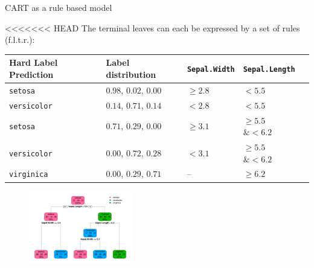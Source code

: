 \documentclass[11pt,compress,t,notes=noshow, xcolor=table]{beamer}
\begin{document}
\begin{vbframe}{CART as a rule based model}

<<<<<<< HEAD
The terminal leaves can each be expressed by a set of rules (f.l.t.r.):

\begin{table}[]
\begin{tabular}{lllll}
Hard Label Prediction &  Label distribution & \texttt{Sepal.Width} & \texttt{Sepal.Length} \\
\hline
\texttt{setosa} & $0.98$, $0.02$, $0.00$ & $\geq 2.8$ & $< 5.5$ \\
\texttt{versicolor} & $0.14$, $0.71$, $0.14$ & $<2.8$ & $< 5.5$ \\
\texttt{setosa} & $0.71$, $0.29$, $0.00$ & $\geq 3.1$ & $\geq 5.5$ $\& < 6.2$ \\
\texttt{versicolor} & $0.00$, $0.72$, $0.28$ & $< 3.1$ & $\geq 5.5$ $\& < 6.2$\\
\texttt{virginica} & $0.00$, $0.29$, $0.71$ &  -- & $\geq 6.2$ \\

\end{tabular}
\end{table}

\begin{figure} 
\includegraphics[width=0.4\textwidth, keepaspectratio]{figure_man/tree_depth3_structure_wide.png}
\end{figure}


\end{vbframe}
\end{document}

